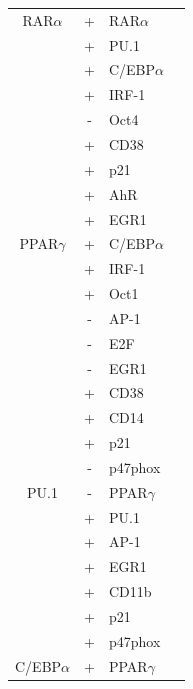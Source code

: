 \documentclass[12pt]{article}
\begin{document}
\begin{center}
\label{tbl:TF-network-connectivity}
\begin{scriptsize}
\begin{supertabular}{c|c|l|l}
\hline
RAR$\alpha$ &  + & RAR$\alpha$ & \cite{Rishi1996} \\
 	&  + & PU.1 & \cite{Mueller2006}\\
 	&  + & C/EBP$\alpha$ & \cite{Friedman2007}\\
 	&  + & IRF-1 & \cite{Luo2006}\\
 	&  - & Oct4 & \cite{Sylvester1994}\\
 	&  + & CD38 & \cite{Drach1994}\\
 	&  + & p21 & \cite{Liu1996}\\
 	&  + & AhR & \cite{Bunaciu2013}\\
 	&  + & EGR1 & \cite{Balmer2002}\\
\hline
PPAR$\gamma$ &  + & C/EBP$\alpha$ & \cite{Rosen2002}\\
 &  + & IRF-1 & \cite{Varley2009}\\
 &  + & Oct1 & \cite{Bruemmer2003}\\
 &  - & AP-1 & \cite{Delerive1999}\\
 &  - & E2F & \cite{Altiok1997}\\
 &  - & EGR1 & \cite{Fei2011}\\
 &  + & CD38 & \cite{Song2012}\\
 &  + & CD14 & \cite{Szanto2005}\\
 &  + & p21 & \cite{Han2004}\\
 &  - & p47phox & \cite{Von-Knethen2002}\\
\hline
PU.1 &  - & PPAR$\gamma$ & \cite{Dispirito2013}\\
&  + & PU.1 & \cite{Chen1995}\\
&  + & AP-1 & \cite{Steidl2006}\\
&  + & EGR1 & \cite{Laslo2006}\\
&  + & CD11b & \cite{Pahl1993}\\
&  + & p21 & \cite{Yuki2013}\\
&  + & p47phox & \cite{Li1999}\\
\hline
C/EBP$\alpha$ &  + & PPAR$\gamma$ & \cite{Rosen2002}\\

\end{supertabular}
\end{scriptsize}
\end{center}
\end{document}
